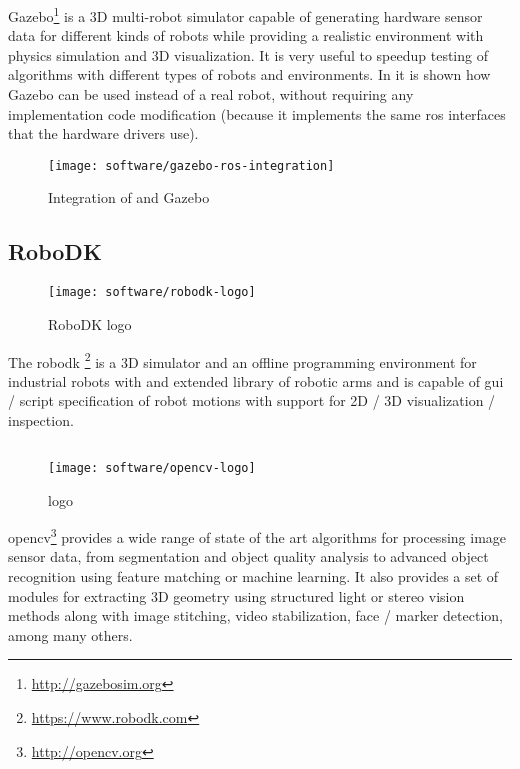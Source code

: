 Gazebo\footnote{\url{http://gazebosim.org}} is a 3D multi-robot simulator capable of generating hardware sensor data for different kinds of robots while providing a realistic environment with physics simulation and 3D visualization. It is very useful to speedup testing of algorithms with different types of robots and environments. In  it is shown how Gazebo can be used instead of a real robot, without requiring any implementation code modification (because it implements the same \gls{ros} interfaces that the hardware drivers use).

\begin{figure}[H]
	\centering
	\texttt{[image: software/gazebo-ros-integration]}
	\caption[Integration of  and Gazebo]{Integration of  and Gazebo\protect\footnotemark}
	\label{fig:gazebo-ros-integration}
\end{figure}


\subsection{RoboDK}

\begin{wrapfigure}{r}{0.23\textwidth}
	\centering
	\vspace*{-2em}
	\texttt{[image: software/robodk-logo]}
	\caption{RoboDK logo}
	\label{fig:robodk-logo}
\end{wrapfigure}

The \gls{robodk} \footnote{\url{https://www.robodk.com}} is a 3D simulator and an offline programming environment for industrial robots with and extended library of robotic arms and is capable of \gls{gui} / script specification of robot motions with support for 2D / 3D visualization / inspection.


\subsection{}

\begin{wrapfigure}{r}{0.23\textwidth}
	\centering
	\vspace*{-2em}
	\texttt{[image: software/opencv-logo]}
	\caption{ logo}
	\label{fig:opencv-logo}
\end{wrapfigure}

\gls{opencv}\footnote{\url{http://opencv.org}} provides a wide range of state of the art algorithms for processing image sensor data, from segmentation and object quality analysis to advanced object recognition using feature matching or machine learning. It also provides a set of modules for extracting 3D geometry using structured light or stereo vision methods along with image stitching, video stabilization, face / marker detection, among many others.


